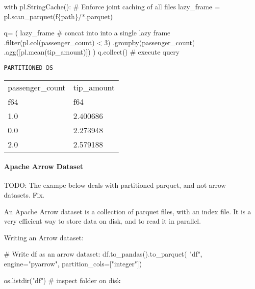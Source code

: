 \documentclass[
  letterpaper,
  DIV=11,
  numbers=noendperiod]{scrartcl}
\let\oldparagraph\paragraph
\renewcommand{\paragraph}[1]{\oldparagraph{#1}\mbox{}}
\newenvironment{Shaded}{\begin{snugshade}}{\end{snugshade}}
\newcommand{\BuiltInTok}[1]{\textcolor[rgb]{0.00,0.23,0.31}{#1}}
\newcommand{\CommentTok}[1]{\textcolor[rgb]{0.37,0.37,0.37}{#1}}
\newcommand{\ControlFlowTok}[1]{\textcolor[rgb]{0.00,0.23,0.31}{#1}}
\newcommand{\DecValTok}[1]{\textcolor[rgb]{0.68,0.00,0.00}{#1}}
\newcommand{\NormalTok}[1]{\textcolor[rgb]{0.00,0.23,0.31}{#1}}
\newcommand{\OperatorTok}[1]{\textcolor[rgb]{0.37,0.37,0.37}{#1}}
\newcommand{\SpecialCharTok}[1]{\textcolor[rgb]{0.37,0.37,0.37}{#1}}
\newcommand{\SpecialStringTok}[1]{\textcolor[rgb]{0.13,0.47,0.30}{#1}}
\newcommand{\StringTok}[1]{\textcolor[rgb]{0.13,0.47,0.30}{#1}}
\begin{document}
\begin{Shaded}
\begin{Highlighting}[]
\ControlFlowTok{with}\NormalTok{ pl.StringCache(): }\CommentTok{\# Enforce joint caching of all files}
\NormalTok{  lazy\_frame }\OperatorTok{=}\NormalTok{ pl.scan\_parquet(}\SpecialStringTok{f\textquotesingle{}}\SpecialCharTok{\{}\NormalTok{path}\SpecialCharTok{\}}\SpecialStringTok{/*.parquet\textquotesingle{}}\NormalTok{)}
  
\NormalTok{q}\OperatorTok{=}\NormalTok{ (}
\NormalTok{    lazy\_frame }\CommentTok{\# concat into into a single lazy frame}
\NormalTok{    .}\BuiltInTok{filter}\NormalTok{(pl.col(}\StringTok{\textquotesingle{}passenger\_count\textquotesingle{}}\NormalTok{) }\OperatorTok{\textless{}} \DecValTok{3}\NormalTok{)}
\NormalTok{    .groupby(}\StringTok{\textquotesingle{}passenger\_count\textquotesingle{}}\NormalTok{)}
\NormalTok{    .agg([pl.mean(}\StringTok{\textquotesingle{}tip\_amount\textquotesingle{}}\NormalTok{)])}
\NormalTok{)}
\NormalTok{q.collect() }\CommentTok{\# execute query}
\end{Highlighting}
\end{Shaded}

\begin{verbatim}
PARTITIONED DS
\end{verbatim}

\begin{longtable}[]{@{}ll@{}}
\toprule()
passenger\_count & tip\_amount \\
f64 & f64 \\
\midrule()
\endhead
1.0 & 2.400686 \\
0.0 & 2.273948 \\
2.0 & 2.579188 \\
\bottomrule()
\end{longtable}

\hypertarget{apache-arrow-dataset}{%
\paragraph{Apache Arrow Dataset}\label{apache-arrow-dataset}}

TODO: The exampe below deals with partitioned parquet, and not arrow
datasets. Fix.

An Apache Arrow dataset is a collection of parquet files, with an index
file. It is a very efficient way to store data on disk, and to read it
in parallel.

Writing an Arrow dataset:

\begin{Shaded}
\begin{Highlighting}[]
\CommentTok{\# Write df as an arrow dataset:}
\NormalTok{df.to\_pandas().to\_parquet(}
    \StringTok{"df"}\NormalTok{, }
\NormalTok{    engine}\OperatorTok{=}\StringTok{"pyarrow"}\NormalTok{, }
\NormalTok{    partition\_cols}\OperatorTok{=}\NormalTok{[}\StringTok{"integer"}\NormalTok{])}

\NormalTok{os.listdir(}\StringTok{"df"}\NormalTok{) }\CommentTok{\# inspect folder on disk}
\end{Highlighting}
\end{Shaded}
\end{document}
